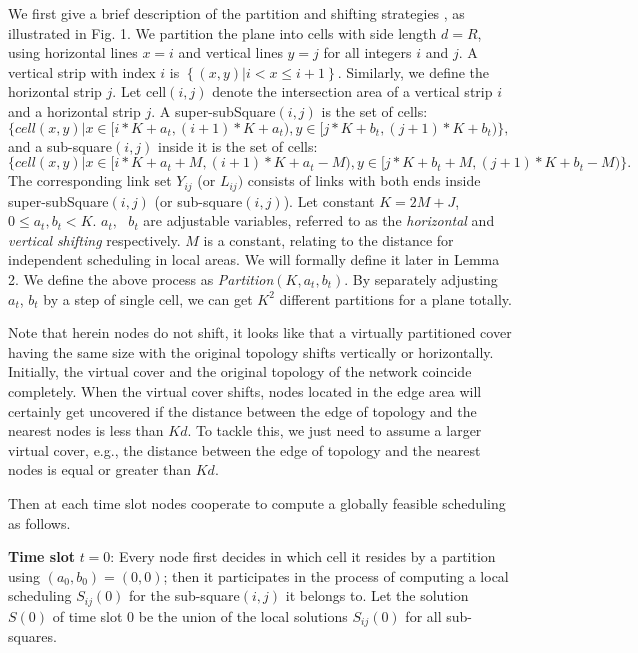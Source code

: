 \documentclass[journal]{IEEEtran}
\begin{document}
We first give a brief description of the partition and shifting strategies \cite{S:pick2}, as illustrated in Fig. 1.
We partition the plane into cells with side length $d =R$, using horizontal lines $x=i$ and vertical lines $y=j$ for all integers $i$ and $j$. A vertical strip with index $i$ is $\left\{ {(x,y)\vert i<x\le i+1} \right\}$. Similarly, we define the horizontal strip $j$. Let $\mbox{cell}(i,j)$ denote the intersection area of a vertical strip $i$ and a horizontal strip $j$.
A super-subSquare$(i,j)$ is the set of cells: $ \{cell(x,y)\vert x\in [i\ast K+a_t, (i+1)\ast K+a_t ), y\in [j\ast K+b_t, (j+1)\ast K+b_t )\} \mbox{,~}$
and a sub-square$(i,j)$ inside it is the set of cells:$\{cell(x,y)\vert x\in [i\ast K+a_t +M,(i+1)\ast K+a_t -M), y\in [j\ast K+b_t +M,(j+1)\ast K+b_t -M)\}.$
The corresponding link set $Y_{ij}$ (or $L_{ij}) $ consists of links with both ends inside super-subSquare$(i,j)$ (or sub-square$(i,j)$).
Let constant $K=2M+J$, $0\le a_t,b_t <K$. $a_t,\mbox{ }b_t $ are adjustable variables, referred to as the
\emph{horizontal} and \emph{vertical} \emph{shifting} respectively. $M$ is a constant, relating to the distance for independent  scheduling in local areas. We will formally define it later in Lemma 2.  We define the above process as \emph{Partition$(K,a_t,b_t )$}. By separately adjusting $a_t$, $b_t $  by a step of single cell, we can get $K^2$ different partitions for a plane totally.

Note that herein nodes do not shift, it looks like that a virtually partitioned cover having the same size with the original topology shifts vertically or horizontally. Initially, the virtual cover and the original topology of the network coincide completely. When the virtual cover shifts, nodes located in the edge area will certainly get uncovered if the distance between the edge of topology and the nearest nodes is less than $Kd$. To tackle this, we just need to assume a larger virtual cover, e.g., the distance between the edge of topology and the nearest nodes is equal or greater than $Kd$.

Then at each time slot nodes cooperate to compute a globally feasible scheduling as follows.

\textbf{Time slot } $t=0$: Every node first decides in which cell it
resides by a partition using $(a_0,b_0 )=(0,0)$; then it
participates in the process of computing a local scheduling $S_{ij} (0)$ for
the sub-square$(i,j)$ it belongs to. Let the solution $S(0) $ of time
slot $0$ be the union of the local solutions $S_{ij} (0)$ for all sub-squares.
\end{document}

